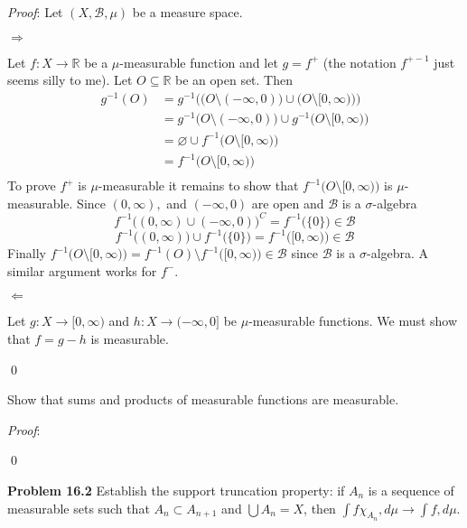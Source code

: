 \documentclass[12pt]{article}
\newcommand{\problem}[1]{\hspace{-4 ex} \large \textbf{Problem #1} }
\let\emptyset\varnothing
\renewenvironment{proof}{\hspace{-4 ex} \emph{Proof}:}{\qed}
\newcommand{\RR}{\mathbb{R}}
\newcommand{\BB}{\mathcal{B}}
\begin{document}
\begin{proof}
	Let $(X, \BB,\mu)$ be a measure space.
	
	$\Longrightarrow$
	
	Let $f: X \to \RR$ be a $\mu$-measurable function and let $g = f^+$ (the notation $f^{+-1}$ just seems silly to me). Let $O \subseteq \RR$ be an open set. Then 
	\begin{align*}
		g^{-1}(O) & = g^{-1}\Big( \big( O \setminus (-\infty,0) \big) \cup \big( O \setminus [0, \infty) \big) \Big) \\
		& = g^{-1} \big( O \setminus (-\infty,0) \big) \cup g^{-1} \big( O \setminus [0, \infty) \big) \\
		& = \emptyset \cup f^{-1} \big( O \setminus [0, \infty) \big) \\
		& = f^{-1} \big( O \setminus [0, \infty) \big) \\
	\end{align*}
	To prove $f^+$ is $\mu$-measurable it remains to show that $f^{-1} \big( O \setminus [0, \infty) \big)$ is $\mu$-measurable.
	Since $(0, \infty),$ and $(-\infty, 0)$ are open and $\BB$ is a $\sigma$-algebra
	$$
	f^{-1} \big( (0, \infty) \cup (-\infty, 0) \big)^C = f^{-1} \big( \{0\} \big ) \in \BB
	$$
	$$
	f^{-1} \big( (0, \infty) \big) \cup f^{-1} \big( \{0\} \big ) = f^{-1} \big( [0, \infty) \big) \in \BB
	$$
	Finally $f^{-1} \big( O \setminus [0, \infty) \big) = f^{-1}(O) \setminus f^{-1} \big( [0, \infty) \big) \in \BB$ since $\BB$ is a $\sigma$-algebra. A similar argument works for $f^-$.
	
	\bigbreak $\Longleftarrow$
	
	Let $g: X \to [0, \infty)$ and $h: X \to (-\infty,0]$ be $\mu$-measurable functions. We must show that $f = g - h$ is measurable.
	
\end{proof}

\bigbreak

Show that sums and products of measurable functions are measurable. \bigbreak

\begin{proof}
	
\end{proof}


\bigbreak
\problem{16.2} Establish the support truncation property: if $A_n$ is a sequence of measurable sets such that $A_n\subset A_{n+1}$ and $\bigcup A_n=X$, then $\int f\chi_{A_n},d\mu\to\int f,d\mu$.
\bigbreak
\end{document}
